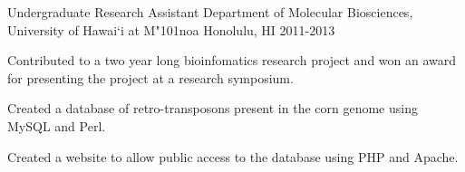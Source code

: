 \begin{cventries}
	\cventry
	{Undergraduate Research Assistant}
	{Department of Molecular Biosciences, University of Hawai`i at M{\char"101}noa}
	{Honolulu, HI}
	{2011-2013}
	{
		\begin{cvitems}
			\item{Contributed to a two year long bioinfomatics research project and won an award for presenting the project at a research symposium.}
			\item {Created a database of retro-transposons present in the corn genome using MySQL and Perl.}
			\item {Created a website to allow public access to the database using PHP and Apache.}
		\end{cvitems}
	}

\end{cventries}

